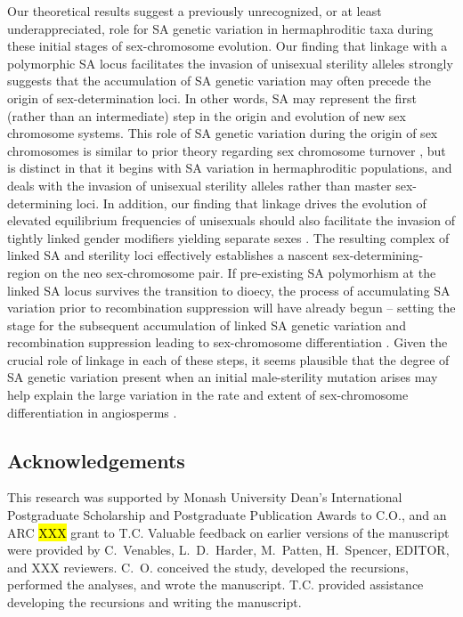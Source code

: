 \documentclass{article}
\begin{document}
Our theoretical results suggest a previously unrecognized, or at least underappreciated, role for SA genetic variation in hermaphroditic taxa during these initial stages of sex-chromosome evolution. Our finding that linkage with a polymorphic SA locus facilitates the invasion of unisexual sterility alleles strongly suggests that the accumulation of SA genetic variation may often precede the origin of sex-determination loci. In other words, SA may represent the first (rather than an intermediate) step in the origin and evolution of new sex chromosome systems. This role of SA genetic variation during the origin of sex chromosomes is similar to prior theory regarding sex chromosome turnover \citep{vanDoornKirkpatrick2007,vanDoornKirkpatrick2010}, but is distinct in that it begins with SA variation in hermaphroditic populations, and deals with the invasion of unisexual sterility alleles rather than master sex-determining loci. In addition, our finding that linkage drives the evolution of elevated equilibrium frequencies of unisexuals should also facilitate the invasion of tightly linked gender modifiers yielding separate sexes \citep{Charlesworth1978a}. The resulting complex of linked SA and sterility loci effectively establishes a nascent sex-determining-region on the neo sex-chromosome pair. If pre-existing SA polymorhism at the linked SA locus survives the transition to dioecy, the process of accumulating SA variation prior to recombination suppression will have already begun -- setting the stage for the subsequent accumulation of linked SA genetic variation and recombination suppression leading to sex-chromosome differentiation \citep{Charlesworth1978a,Rice1987,Bachtrog2006,Qiuetal2013}. Given the crucial role of linkage in each of these steps, it seems plausible that the degree of SA genetic variation present when an initial male-sterility mutation arises may help explain the large variation in the rate and extent of sex-chromosome differentiation in angiosperms \citep{Charlesworth2002,Renner2014,Bachtrog2014}.


\subsection*{Acknowledgements}
This research was supported by Monash University Dean's International Postgraduate Scholarship and Postgraduate Publication Awards to C.O., and an ARC \hl{XXX} grant to T.C. Valuable feedback on earlier versions of the manuscript were provided by C.~Venables, L.~D.~Harder, M.~Patten, H.~Spencer, EDITOR, and XXX reviewers. C.~O. conceived the study, developed the recursions, performed the analyses, and wrote the manuscript. T.C. provided assistance developing the recursions and writing the manuscript.
\end{document}
